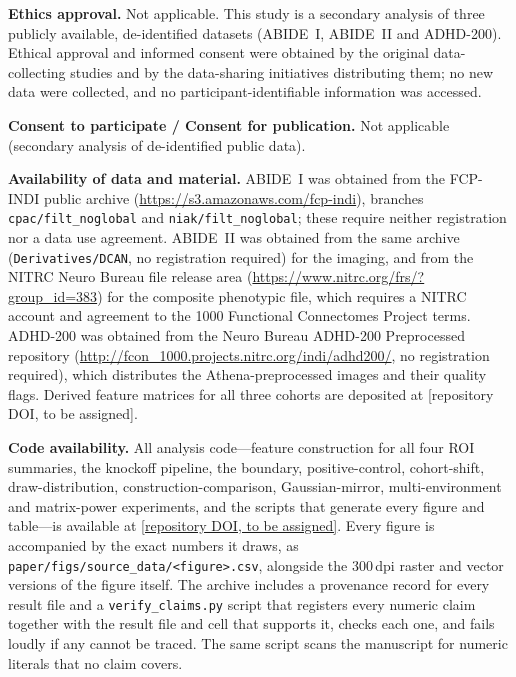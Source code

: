 \documentclass[11pt,a4paper]{article}
\begin{document}
\medskip
\noindent\textbf{Ethics approval.} \quad Not applicable. This study is a
secondary analysis of three publicly available, de-identified datasets
(ABIDE~I, ABIDE~II and ADHD-200). Ethical approval and informed consent were obtained
by the original data-collecting studies and by the data-sharing initiatives
distributing them; no new data were collected, and no
participant-identifiable information was accessed.

\medskip
\noindent\textbf{Consent to participate / Consent for publication.} \quad
Not applicable (secondary analysis of de-identified public data).

\medskip
\noindent\textbf{Availability of data and material.} \quad ABIDE~I was
obtained from the FCP-INDI public archive
(\url{https://s3.amazonaws.com/fcp-indi}), branches
\texttt{cpac/filt\_noglobal} and \texttt{niak/filt\_noglobal}; these require
neither registration nor a data use agreement. ABIDE~II was obtained from
the same archive (\texttt{Derivatives/DCAN}, no registration required) for
the imaging, and from the NITRC Neuro Bureau file release area
(\url{https://www.nitrc.org/frs/?group_id=383}) for the composite
phenotypic file, which requires a NITRC account and agreement to the 1000
Functional Connectomes Project terms. ADHD-200
\citep{adhd200consortium2012} was obtained from the Neuro Bureau
ADHD-200 Preprocessed repository \citep{bellec2017adhd200}
(\url{http://fcon_1000.projects.nitrc.org/indi/adhd200/}, no registration
required), which distributes the Athena-preprocessed images and their
quality flags. Derived feature matrices for all three cohorts are deposited
at [repository DOI, to be assigned].

\medskip
\noindent\textbf{Code availability.} \quad All analysis code---feature
construction for all four ROI summaries, the knockoff pipeline, the
boundary, positive-control, cohort-shift, draw-distribution,
construction-comparison, Gaussian-mirror, multi-environment and
matrix-power experiments, and the scripts that generate every figure and
table---is available at \url{[repository DOI, to be assigned]}. Every figure
is accompanied by the exact numbers it draws, as
\texttt{paper/figs/source\_data/<figure>.csv}, alongside the 300\,dpi raster
and vector versions of the figure itself. The archive
includes a provenance record for every result file and a
\texttt{verify\_claims.py} script that registers every numeric claim together
with the result file and cell that supports it, checks each one, and fails
loudly if any cannot be traced. The same script scans the manuscript for
numeric literals that no claim covers.
\end{document}
